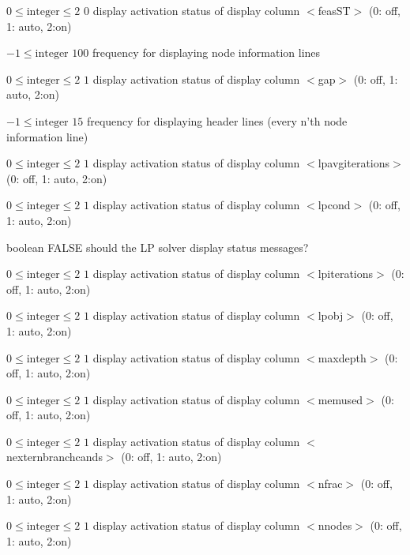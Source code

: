 %
{$0\leq\textrm{integer}\leq2$}%
{$0$}%
{display activation status of display column $<$feasST$>$ (0: off, 1: auto, 2:on)}%
{}

%
{$-1\leq\textrm{integer}$}%
{$100$}%
{frequency for displaying node information lines}%
{}

%
{$0\leq\textrm{integer}\leq2$}%
{$1$}%
{display activation status of display column $<$gap$>$ (0: off, 1: auto, 2:on)}%
{}

%
{$-1\leq\textrm{integer}$}%
{$15$}%
{frequency for displaying header lines (every n'th node information line)}%
{}

%
{$0\leq\textrm{integer}\leq2$}%
{$1$}%
{display activation status of display column $<$lpavgiterations$>$ (0: off, 1: auto, 2:on)}%
{}

%
{$0\leq\textrm{integer}\leq2$}%
{$1$}%
{display activation status of display column $<$lpcond$>$ (0: off, 1: auto, 2:on)}%
{}

%
{boolean}%
{FALSE}%
{should the LP solver display status messages?}%
{}

%
{$0\leq\textrm{integer}\leq2$}%
{$1$}%
{display activation status of display column $<$lpiterations$>$ (0: off, 1: auto, 2:on)}%
{}

%
{$0\leq\textrm{integer}\leq2$}%
{$1$}%
{display activation status of display column $<$lpobj$>$ (0: off, 1: auto, 2:on)}%
{}

%
{$0\leq\textrm{integer}\leq2$}%
{$1$}%
{display activation status of display column $<$maxdepth$>$ (0: off, 1: auto, 2:on)}%
{}

%
{$0\leq\textrm{integer}\leq2$}%
{$1$}%
{display activation status of display column $<$memused$>$ (0: off, 1: auto, 2:on)}%
{}

%
{$0\leq\textrm{integer}\leq2$}%
{$1$}%
{display activation status of display column $<$nexternbranchcands$>$ (0: off, 1: auto, 2:on)}%
{}

%
{$0\leq\textrm{integer}\leq2$}%
{$1$}%
{display activation status of display column $<$nfrac$>$ (0: off, 1: auto, 2:on)}%
{}

%
{$0\leq\textrm{integer}\leq2$}%
{$1$}%
{display activation status of display column $<$nnodes$>$ (0: off, 1: auto, 2:on)}%
{}

